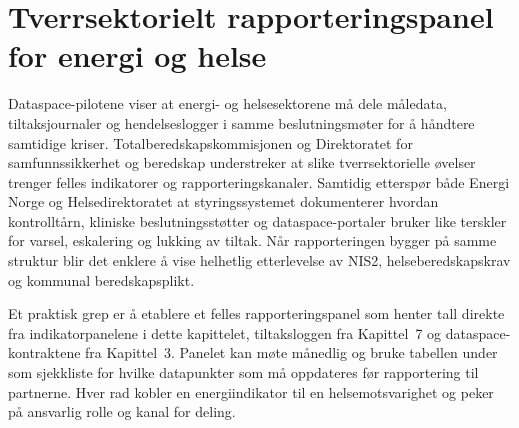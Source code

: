 \section{Tverrsektorielt rapporteringspanel for energi og helse}
Dataspace-pilotene viser at energi- og helsesektorene må dele måledata, tiltaksjournaler og hendelseslogger i samme beslutningsmøter for å håndtere samtidige kriser. Totalberedskapskommisjonen og Direktoratet for samfunnssikkerhet og beredskap understreker at slike tverrsektorielle øvelser trenger felles indikatorer og rapporteringskanaler.\citep{dsb2023totalberedskap,dsb2024nser} Samtidig etterspør både Energi Norge og Helsedirektoratet at styringssystemet dokumenterer hvordan kontrolltårn, kliniske beslutningsstøtter og dataspace-portaler bruker like terskler for varsel, eskalering og lukking av tiltak.\citep{energinorge2023beredskap,helsedir2023beredskap} Når rapporteringen bygger på samme struktur blir det enklere å vise helhetlig etterlevelse av NIS2, helseberedskapskrav og kommunal beredskapsplikt.

Et praktisk grep er å etablere et felles rapporteringspanel som henter tall direkte fra indikatorpanelene i dette kapittelet, tiltaksloggen fra Kapittel~7 og dataspace-kontraktene fra Kapittel~3. Panelet kan møte månedlig og bruke tabellen under som sjekkliste for hvilke datapunkter som må oppdateres før rapportering til partnerne. Hver rad kobler en energiindikator til en helsemotsvarighet og peker på ansvarlig rolle og kanal for deling.

